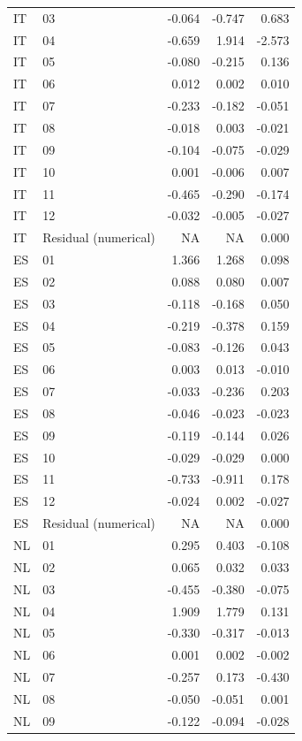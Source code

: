 \begin{longtable}[t]{llrrr}
IT & 03 & -0.064 & -0.747 & 0.683\\
IT & 04 & -0.659 & 1.914 & -2.573\\
\addlinespace
IT & 05 & -0.080 & -0.215 & 0.136\\
IT & 06 & 0.012 & 0.002 & 0.010\\
IT & 07 & -0.233 & -0.182 & -0.051\\
IT & 08 & -0.018 & 0.003 & -0.021\\
IT & 09 & -0.104 & -0.075 & -0.029\\
\addlinespace
IT & 10 & 0.001 & -0.006 & 0.007\\
IT & 11 & -0.465 & -0.290 & -0.174\\
IT & 12 & -0.032 & -0.005 & -0.027\\
IT & Residual (numerical) & NA & NA & 0.000\\
ES & 01 & 1.366 & 1.268 & 0.098\\
\addlinespace
ES & 02 & 0.088 & 0.080 & 0.007\\
ES & 03 & -0.118 & -0.168 & 0.050\\
ES & 04 & -0.219 & -0.378 & 0.159\\
ES & 05 & -0.083 & -0.126 & 0.043\\
ES & 06 & 0.003 & 0.013 & -0.010\\
\addlinespace
ES & 07 & -0.033 & -0.236 & 0.203\\
ES & 08 & -0.046 & -0.023 & -0.023\\
ES & 09 & -0.119 & -0.144 & 0.026\\
ES & 10 & -0.029 & -0.029 & 0.000\\
ES & 11 & -0.733 & -0.911 & 0.178\\
\addlinespace
ES & 12 & -0.024 & 0.002 & -0.027\\
ES & Residual (numerical) & NA & NA & 0.000\\
NL & 01 & 0.295 & 0.403 & -0.108\\
NL & 02 & 0.065 & 0.032 & 0.033\\
NL & 03 & -0.455 & -0.380 & -0.075\\
\addlinespace
NL & 04 & 1.909 & 1.779 & 0.131\\
NL & 05 & -0.330 & -0.317 & -0.013\\
NL & 06 & 0.001 & 0.002 & -0.002\\
NL & 07 & -0.257 & 0.173 & -0.430\\
NL & 08 & -0.050 & -0.051 & 0.001\\
\addlinespace
NL & 09 & -0.122 & -0.094 & -0.028\\

\end{longtable}
